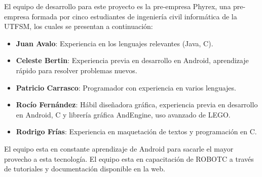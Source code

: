 El equipo de desarrollo para este proyecto es la pre-empresa Phyrex, una pre-empresa formada por cinco estudiantes de ingenier\'ia civil inform\'atica de la UTFSM, los cuales se presentan a continuaci\'on:

\begin{itemize}
\item {\bf Juan Avalo}: Experiencia en los lenguajes relevantes (Java, C). 
\item {\bf Celeste Bertin}: Experiencia previa en desarrollo en Android, aprendizaje r\'apido para resolver problemas nuevos. 
\item {\bf Patricio Carrasco}: Programador con experiencia en varios lenguajes.
\item {\bf Roc\'io Fern\'andez}: H\'abil dise\~nadora gr\'afica, experiencia previa en desarrollo en Android, C y librer\'ia gr\'afica AndEngine, uso avanzado de LEGO. 
\item {\bf Rodrigo Fr\'ias}: Experiencia en maquetaci\'on de textos y programaci\'on en C.
\end{itemize}

El equipo esta en constante aprendizaje de Android para sacarle el mayor provecho a esta tecnolog\'ia. El equipo esta en capacitaci\'on de ROBOTC a trav\'es de tutoriales y documentaci\'on disponible en la web. 

